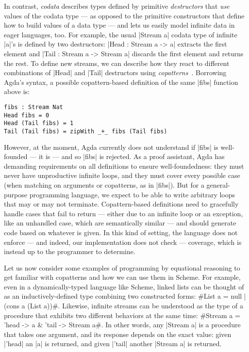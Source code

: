 In contrast, \emph{codata} describes types defined by primitive \emph{destructors} that \emph{use} values of the codata type --- as opposed to the primitive constructors that define how to build values of a data type --- and lets us easily model infinite data in eager languages, too.
For example, the usual \agda|Stream a| codata type of infinite \agda|a|'s is defined by two destructors: \agda|Head : Stream a -> a| extracts the first element and \agda|Tail : Stream a -> Stream a| discards the first element and returns the rest.
To define new streams, we can describe how they react to different combinations of \agda|Head| and \agda|Tail| destructors using \emph{copatterns}~\cite{APTS2013C}.
Borrowing Agda's syntax, a possible copattern-based definition of the same \agda|fibs| function above is:
\begin{verbatim}
fibs : Stream Nat
Head fibs = 0
Head (Tail fibs) = 1
Tail (Tail fibs) = zipWith _+_ fibs (Tail fibs)
\end{verbatim}
However, at the moment, Agda currently does not understand if \agda|fibs| is well-founded --- it is --- and so \agda|fibs| is rejected.
As a proof assistant, Agda has demanding requirements on all definitions to ensure well-foundedness:
they must never have unproductive infinite loops, and they must cover every possible case (when matching on arguments or copatterns, as in \agda|fibs|).
But for a general-purpose programming language, we expect to be able to write arbitrary loops that may or may not terminate.
Copattern-based definitions need to gracefully handle cases that fail to return --- either due to an infinite loop or an exception, like an unhandled case, which are semantically similar \cite{ImpreciseExceptions} --- and should generate code based on whatever is given.
In this kind of setting, the language does not enforce --- and indeed, our implementation does not check --- coverage, which is instead up to the programmer to determine.

Let us now consider some examples of programming by equational reasoning to get familiar with copatterns and how we can use them in Scheme.
For example, even in a dynamically-typed language like Scheme, linked lists can be thought of as an inductively-defined type combining two constructed forms: \scm#List a = null | (cons a (List a))#.
Likewise, infinite streams can be understood as the type of a procedure that exhibits two different behaviors at the same time: \scm#Stream a = 'head -> a & 'tail -> Stream a#.
In other words, any \scm|Stream a| is a procedure that takes one argument, and its response depends on the exact value: given \scm|'head| an \scm|a| is returned, and given \scm|'tail| another \scm|Stream a| is returned.

